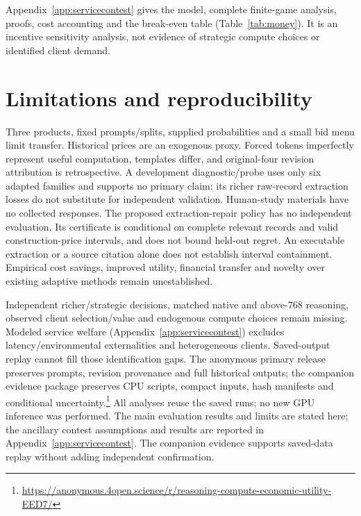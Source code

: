 \documentclass[sigconf,anonymous,nonacm]{acmart}
\begin{document}
Appendix~\ref{app:servicecontest} gives the model, complete finite-game analysis, proofs, cost accounting and the break-even table (Table~\ref{tab:money}). It is an incentive sensitivity analysis, not evidence of strategic compute choices or identified client demand.

\section{Limitations and reproducibility}\label{sec:limitations}
Three products, fixed prompts/splits, supplied probabilities and a small bid menu limit transfer. Historical prices are an exogenous proxy. Forced tokens imperfectly represent useful computation, templates differ, and original-four revision attribution is retrospective. A development diagnostic/probe uses only six adapted families and supports no primary claim; its richer raw-record extraction losses do not substitute for independent validation. Human-study materials have no collected responses.
The proposed extraction-repair policy has no independent evaluation. Its certificate is conditional on complete relevant records and valid construction-price intervals, and does not bound held-out regret. An executable extraction or a source citation alone does not establish interval containment. Empirical cost savings, improved utility, financial transfer and novelty over existing adaptive methods remain unestablished.

Independent richer/strategic decisions, matched native and above-768 reasoning, observed client selection/value and endogenous compute choices remain missing. Modeled service welfare (Appendix~\ref{app:servicecontest}) excludes latency/environmental externalities and heterogeneous clients. Saved-output replay cannot fill those identification gaps. The anonymous primary release preserves prompts, revision provenance and full historical outputs; the companion evidence package preserves CPU scripts, compact inputs, hash manifests and conditional uncertainty.\footnote{\url{https://anonymous.4open.science/r/reasoning-compute-economic-utility-EED7/}} All analyses reuse the saved runs; no new GPU inference was performed. The main evaluation results and limits are stated here; the ancillary contest assumptions and results are reported in Appendix~\ref{app:servicecontest}. The companion evidence supports saved-data replay without adding independent confirmation.
\end{document}
